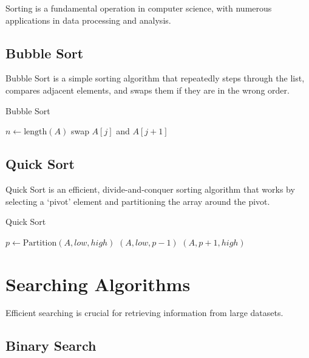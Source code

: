 Sorting is a fundamental operation in computer science, with numerous
applications in data processing and analysis.

\subsection{Bubble Sort}

Bubble Sort is a simple sorting algorithm that repeatedly steps through
the list, compares adjacent elements, and swaps them if they are in the
wrong order.

\begin{algorithm}
\caption{Bubble Sort}
\begin{algorithmic}
    \STATE $n \gets \text{length}(A)$
                \STATE swap $A[j]$ and $A[j+1]$
            \ENDIF
        \ENDFOR
    \ENDFOR
\ENDPROCEDURE
\end{algorithmic}
\end{algorithm}

\subsection{Quick Sort}

Quick Sort is an efficient, divide-and-conquer sorting algorithm that
works by selecting a `pivot' element and partitioning the array around
the pivot.

\begin{algorithm}
\caption{Quick Sort}
\begin{algorithmic}
        \STATE $p \gets \text{Partition}(A, low, high)$
        \STATE {}$(A, low, p-1)$
        \STATE {}$(A, p+1, high)$
    \ENDIF
\ENDPROCEDURE
\end{algorithmic}
\end{algorithm}

\section{Searching Algorithms}

Efficient searching is crucial for retrieving information from large
datasets.

\subsection{Binary Search}

